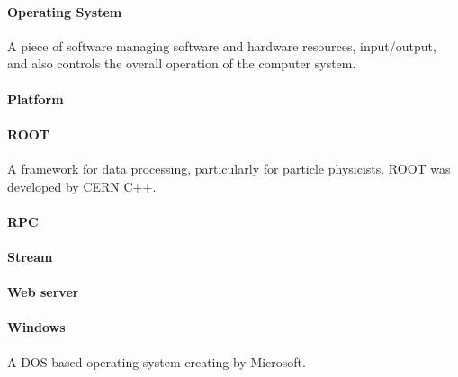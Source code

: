 \paragraph{Operating System}
A piece of software managing software and hardware resources, input/output, and also controls the overall operation of the computer system.
\paragraph{Platform}

\paragraph{ROOT}
A framework for data processing, particularly for particle physicists. ROOT was developed by CERN C++.


\paragraph{RPC}

\paragraph{Stream}

\paragraph{Web server}

\paragraph{Windows}
A DOS based operating system creating by Microsoft.